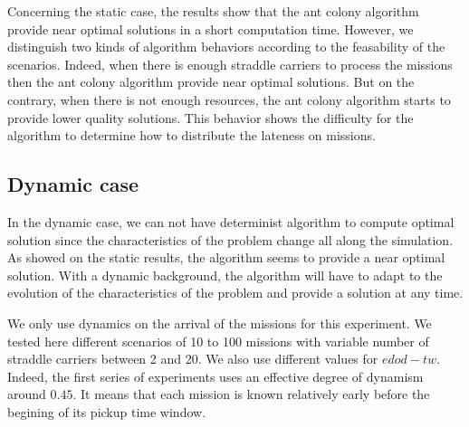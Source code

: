 \documentclass[a4paper,10pt]{article}
\begin{document}
Concerning the static case, the results show that the ant colony algorithm provide near optimal solutions in a short computation time. However, we distinguish two kinds of algorithm behaviors according to the feasability of the scenarios. Indeed, when there is enough straddle carriers to process the missions then the ant colony algorithm provide near optimal solutions. But on the contrary, when there is not enough resources, the ant colony algorithm starts to provide lower quality solutions. This behavior shows the difficulty for the algorithm to determine how to distribute the lateness on missions.

	\subsection{Dynamic case}
In the dynamic case, we can not have determinist algorithm to compute optimal solution since the characteristics of the problem change all along the simulation. As showed on the static results, the algorithm seems to provide a near optimal solution. With a dynamic background, the algorithm will have to adapt to the evolution of the characteristics of the problem and provide a solution at any time.

 We only use dynamics on the arrival of the missions for this experiment. We tested here different scenarios of 10 to 100 missions with variable number of straddle carriers between 2 and 20. We also use different values for $edod-tw$. Indeed, the first series of experiments uses an effective degree of dynamism around $0.45$. It means that each mission is known relatively early before the begining of its pickup time window.
\end{document}
